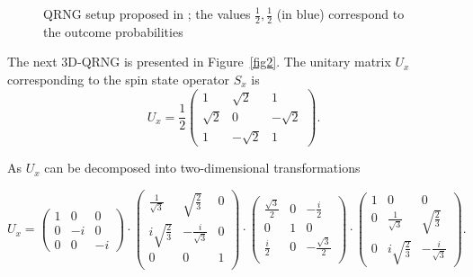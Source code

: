 \documentclass[l1pt]{elsarticle}
\begin{document}
{\begin{figure}[ht]
\caption{QRNG setup proposed in \cite{abbott2012strongrandomness}; the values $\frac{1}{2},\frac{1}{2}$ (in blue) correspond to the outcome probabilities}
\label{fig1}
\end{figure}

The next 3D-QRNG is presented in
Figure~\ref{fig2}. The unitary matrix $U_{x}$ corresponding to the spin state operator $S_x$ is
 $$ U_x = \frac{1}{2}
 \begin{pmatrix}
 1 & \sqrt{2} & 1\\
 \sqrt{2} & 0 & -\sqrt{2}\\
 1 & -\sqrt{2} & 1
 \end{pmatrix}.$$

As  $U_x$ can be decomposed into two-dimensional transformations~\cite{Clements:16}

$$U_x =
\begin{pmatrix}1&0&0\\
0&-i&0\\
0&0&-i
\end{pmatrix}
\cdot
\begin{pmatrix}
\frac{1}{\sqrt{3}} & \sqrt{\frac{2}{3}} & 0\\
i\sqrt{\frac{2}{3}} & -\frac{i}{\sqrt{3}} & 0\\
0&0&1\\
\end{pmatrix}
\cdot
\begin{pmatrix}
\frac{\sqrt{3}}{2} & 0 & -\frac{i}{2}\\
0&1&0\\
\frac{i}{2}& 0 & -\frac{\sqrt{3}}{2}\\
\end{pmatrix}
\cdot
\begin{pmatrix}
1&0&0\\
0&\frac{1}{\sqrt{3}} &\sqrt{\frac{2}{3}}\\
0 & i\sqrt{\frac{2}{3}} & -\frac{i}{\sqrt{3}}
\end{pmatrix}.
$$

}
\end{document}
